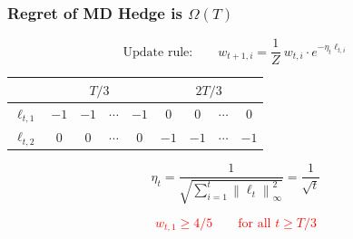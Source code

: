 \documentclass[usenames,dvipsnames]{beamer}
\newcommand{\norm}[1]{\left\|#1\right\|}
\begin{document}
\begin{frame}
\frametitle{Regret of MD Hedge is $\Omega(T)$}

$$
\text{Update rule:} \qquad w_{t+1,i} = \frac{1}{Z} \ w_{t,i} \cdot e^{-\eta_t \ell_{t,i}}
$$

\pause
\vspace{1cm}

\begin{tabular}{|c|c|c|c|c|c|c|c|c|}
\hline
&  \multicolumn{4}{|c}{$T/3$} & \multicolumn{4}{|c|}{$2T/3$} \\
\hline
$\ell_{t,1}$ & $-1$ & $-1$ & $\cdots$ & $-1$ & $0$ & $0$ & $\cdots$ & $0$ \\
\hline
$\ell_{t,2}$ & $0$ & $0$ & $\cdots$ & $0$ & $-1$ & $-1$ & $\cdots$ & $-1$ \\
\hline
\end{tabular}

\pause
\vspace{1cm}

$$
\eta_t = \frac{1}{\sqrt{\sum_{i=1}^t \norm{\ell_t}_\infty^2}} = \frac{1}{\sqrt{t}}
$$

\pause
\vspace{1cm}

\textcolor{red}{
$$
w_{t,1} \ge 4/5 \qquad \text{for all $t \ge T/3$}
$$
}

\end{frame}

%
%
%
%
%
%
\end{document}
